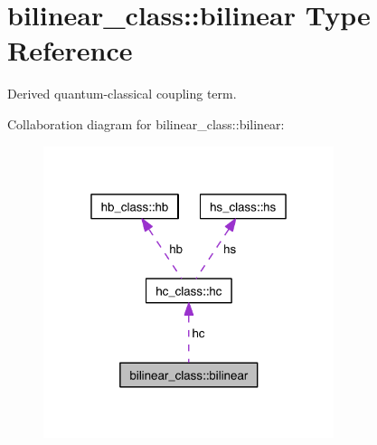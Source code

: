 \hypertarget{structbilinear__class_1_1bilinear}{}\section{bilinear\+\_\+class\+:\+:bilinear Type Reference}
\label{structbilinear__class_1_1bilinear}


Derived quantum-\/classical coupling term.  




Collaboration diagram for bilinear\+\_\+class\+:\+:bilinear\+:\nopagebreak
\begin{figure}[H]
\begin{center}
\leavevmode
\includegraphics[width=241pt]{structbilinear__class_1_1bilinear__coll__graph}
\end{center}
\end{figure}
